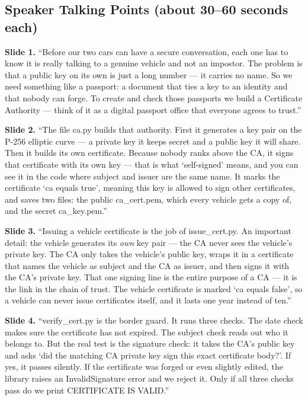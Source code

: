 \documentclass[11pt,a4paper]{article}
\begin{document}
\subsection{Speaker Talking Points (about 30--60 seconds each)}

\textbf{Slide 1.} ``Before our two cars can have a secure conversation, each one
has to know it is really talking to a genuine vehicle and not an impostor. The
problem is that a public key on its own is just a long number --- it carries no
name. So we need something like a passport: a document that ties a key to an
identity and that nobody can forge. To create and check those passports we build
a Certificate Authority --- think of it as a digital passport office that
everyone agrees to trust.''

\textbf{Slide 2.} ``The file ca.py builds that authority. First it generates a
key pair on the P-256 elliptic curve --- a private key it keeps secret and a
public key it will share. Then it builds its own certificate. Because nobody
ranks above the CA, it signs that certificate with its own key --- that is what
`self-signed' means, and you can see it in the code where subject and issuer are
the same name. It marks the certificate `ca equals true', meaning this key is
allowed to sign other certificates, and saves two files: the public ca\_cert.pem,
which every vehicle gets a copy of, and the secret ca\_key.pem.''

\textbf{Slide 3.} ``Issuing a vehicle certificate is the job of issue\_cert.py.
An important detail: the vehicle generates its \emph{own} key pair --- the CA
never sees the vehicle's private key. The CA only takes the vehicle's public key,
wraps it in a certificate that names the vehicle as subject and the CA as issuer,
and then signs it with the CA's private key. That one signing line is the entire
purpose of a CA --- it is the link in the chain of trust. The vehicle certificate
is marked `ca equals false', so a vehicle can never issue certificates itself,
and it lasts one year instead of ten.''

\textbf{Slide 4.} ``verify\_cert.py is the border guard. It runs three checks.
The date check makes sure the certificate has not expired. The subject check
reads out who it belongs to. But the real test is the signature check: it takes
the CA's public key and asks `did the matching CA private key sign this exact
certificate body?'. If yes, it passes silently. If the certificate was forged or
even slightly edited, the library raises an InvalidSignature error and we reject
it. Only if all three checks pass do we print CERTIFICATE IS VALID.''
\end{document}
